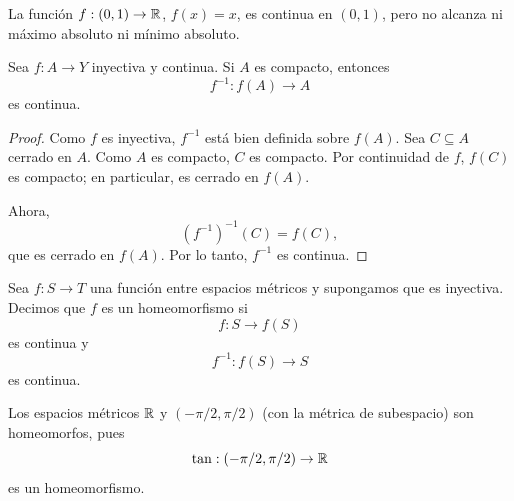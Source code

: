 \begin{example}
La función $f:(0,1)\to\mathbb{R}$, $f(x)=x$, es continua en $(0,1)$, pero no alcanza ni máximo absoluto ni mínimo absoluto.
\end{example}

\begin{teorema}
Sea $f:A\to Y$ inyectiva y continua. Si $A$ es compacto, entonces
\[
f^{-1}:f(A)\to A
\]
es continua.
\end{teorema}

\begin{proof}
Como $f$ es inyectiva, $f^{-1}$ está bien definida sobre $f(A)$.
Sea $C\subseteq A$ cerrado en $A$. Como $A$ es compacto, $C$ es compacto.
Por continuidad de $f$, $f(C)$ es compacto; en particular, es cerrado en $f(A)$.

Ahora,
\[
(f^{-1})^{-1}(C)=f(C),
\]
que es cerrado en $f(A)$. Por lo tanto, $f^{-1}$ es continua.
\end{proof}

\begin{definicion}[Homeomorfismo]
Sea $f:S\to T$ una función entre espacios métricos y supongamos que es inyectiva.
Decimos que $f$ es un homeomorfismo si
\[
f:S\to f(S)
\]
es continua y
\[
f^{-1}:f(S)\to S
\]
es continua.
\end{definicion}

\begin{example}
Los espacios métricos $\mathbb{R}$ y $(-\pi/2,\pi/2)$ (con la métrica de subespacio) son homeomorfos, pues
\[
\tan:(-\pi/2,\pi/2)\to\mathbb{R}
\]
es un homeomorfismo.
\end{example}
